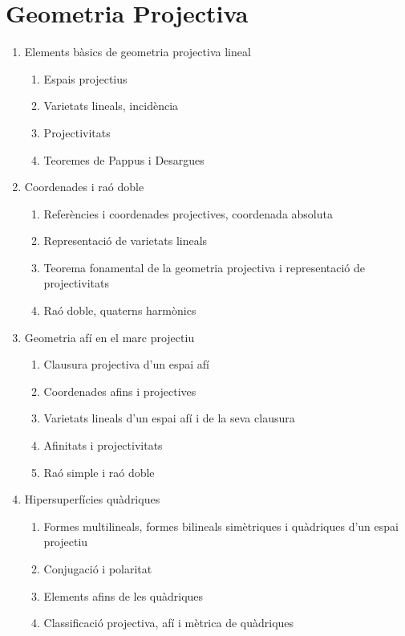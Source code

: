 \documentclass{article}
\begin{document}
\section{Geometria Projectiva}
\begin{enumerate}
 \item Elements bàsics de geometria projectiva lineal
	\begin{enumerate}
 	\item Espais projectius
 	\item Varietats lineals, incidència
 	\item Projectivitats
 	\item Teoremes de Pappus i Desargues
	\end{enumerate}
 \item Coordenades i raó doble
	\begin{enumerate}
 	\item Referències i coordenades projectives, coordenada absoluta
 	\item Representació de varietats lineals
 	\item Teorema fonamental de la geometria projectiva i representació de projectivitats
 	\item Raó doble, quaterns harmònics
	\end{enumerate}
 \item Geometria afí en el marc projectiu
	\begin{enumerate}
 	\item Clausura projectiva d’un espai afí
 	\item Coordenades afins i projectives
 	\item Varietats lineals d’un espai afí i de la seva clausura
 	\item Afinitats i projectivitats
 	\item Raó simple i raó doble
	\end{enumerate}
 \item Hipersuperfícies quàdriques
	\begin{enumerate}
 	\item Formes multilineals, formes bilineals simètriques i quàdriques d’un espai projectiu
 	\item Conjugació i polaritat
 	\item Elements afins de les quàdriques
 	\item Classificació projectiva, afí i mètrica de quàdriques
	\end{enumerate}
\end{enumerate}
 \newpage
\end{document}
